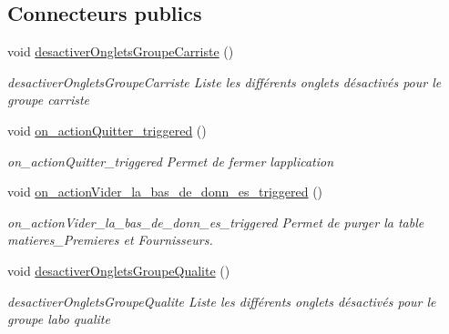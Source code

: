 \subsection*{Connecteurs publics}
\begin{DoxyCompactItemize}
\item 
\mbox{\label{class_main_window_a5b477f0785cfed5fdffcda39ad7b92cb}} 
void \mbox{\hyperlink{class_main_window_a5b477f0785cfed5fdffcda39ad7b92cb}{desactiver\+Onglets\+Groupe\+Carriste}} ()
\begin{DoxyCompactList}\small\item\em desactiver\+Onglets\+Groupe\+Carriste Liste les différents onglets désactivés pour le groupe carriste \end{DoxyCompactList}\item 
\mbox{\label{class_main_window_afe9d9d46e61e2460e636619577a9e8fd}} 
void \mbox{\hyperlink{class_main_window_afe9d9d46e61e2460e636619577a9e8fd}{on\+\_\+action\+Quitter\+\_\+triggered}} ()
\begin{DoxyCompactList}\small\item\em on\+\_\+action\+Quitter\+\_\+triggered Permet de fermer l\textquotesingle{}application \end{DoxyCompactList}\item 
\mbox{\label{class_main_window_af416c87932d9675ef70ea737ad4b1a86}} 
void \mbox{\hyperlink{class_main_window_af416c87932d9675ef70ea737ad4b1a86}{on\+\_\+action\+Vider\+\_\+la\+\_\+bas\+\_\+de\+\_\+donn\+\_\+es\+\_\+triggered}} ()
\begin{DoxyCompactList}\small\item\em on\+\_\+action\+Vider\+\_\+la\+\_\+bas\+\_\+de\+\_\+donn\+\_\+es\+\_\+triggered Permet de purger la table matieres\+\_\+\+Premieres et Fournisseurs. \end{DoxyCompactList}\item 
\mbox{\label{class_main_window_a720083a9a815c386b46003d02b4034da}} 
void \mbox{\hyperlink{class_main_window_a720083a9a815c386b46003d02b4034da}{desactiver\+Onglets\+Groupe\+Qualite}} ()
\begin{DoxyCompactList}\small\item\em desactiver\+Onglets\+Groupe\+Qualite Liste les différents onglets désactivés pour le groupe labo qualite \end{DoxyCompactList}\item 

\end{DoxyCompactItemize}
